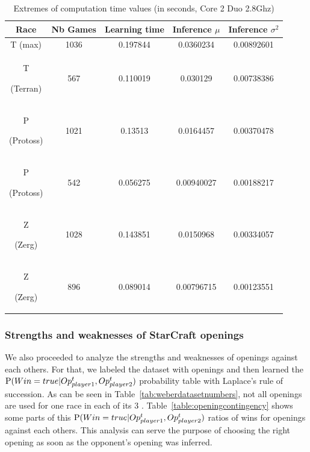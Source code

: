 \begin{table}[h]
\caption{Extremes of computation time values (in seconds, Core 2 Duo 2.8Ghz)}
\begin{center}
\begin{tabular}{|c|cc|cc|}
\hline
Race
& Nb Games
& Learning time
& Inference $\mu$
& Inference $\sigma^2$ \\ \hline
T (max) & 1036 & 0.197844 & 0.0360234 & 0.00892601 \\
T \begin{tiny}(Terran)\end{tiny} & 567 & 0.110019 & 0.030129 & 0.00738386 \\ 
P \begin{tiny}(Protoss)\end{tiny} & 1021 & 0.13513 & 0.0164457 & 0.00370478 \\
P \begin{tiny}(Protoss)\end{tiny} & 542 & 0.056275 & 0.00940027 & 0.00188217 \\ 
Z \begin{tiny}(Zerg)\end{tiny} & 1028 & 0.143851 & 0.0150968 & 0.00334057 \\
Z \begin{tiny}(Zerg)\end{tiny} & 896 & 0.089014 & 0.00796715 & 0.00123551 \\ \hline
\end{tabular}
\label{CPU}
\end{center}
\end{table}

\subsubsection{Strengths and weaknesses of StarCraft openings}
\label{sec:openingsstrengthsweaknesses}

We also proceeded to analyze the strengths and weaknesses of openings against each others. For that, we labeled the dataset with openings and then learned the $\mathrm{P}(Win=true|Op_{player1}^t,Op_{player2}^t)$ probability table with Laplace's rule of succession. As can be seen in Table~\ref{tab:weberdatasetnumbers}, not all openings are used for one race in each of its 3 . Table~\ref{table:openingcontingency} shows some parts of this $\mathrm{P}(Win=true|Op_{player1}^t,Op_{player2}^t)$ ratios of wins for openings against each others. This analysis can serve the purpose of choosing the right opening as soon as the opponent's opening was inferred.

